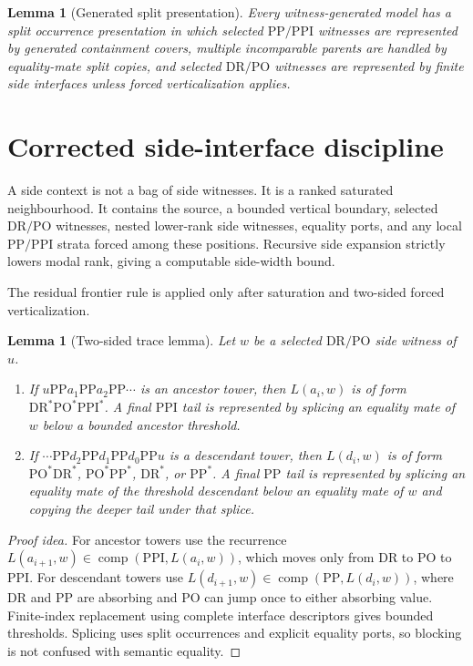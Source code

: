 \documentclass[11pt]{article}
\newtheorem{lemma}[theorem]{Lemma}
\newcommand{\comp}{\operatorname{comp}}
\newcommand{\PP}{\mathrm{PP}}
\newcommand{\PPI}{\mathrm{PPI}}
\newcommand{\DR}{\mathrm{DR}}
\newcommand{\PO}{\mathrm{PO}}
\begin{document}
\begin{lemma}[Generated split presentation]
Every witness-generated model has a split occurrence presentation in which selected $\PP/\PPI$ witnesses are represented by generated containment covers, multiple incomparable parents are handled by equality-mate split copies, and selected $\DR/\PO$ witnesses are represented by finite side interfaces unless forced verticalization applies.
\end{lemma}

\section{Corrected side-interface discipline}

A side context is not a bag of side witnesses.  It is a ranked saturated neighbourhood.  It contains the source, a bounded vertical boundary, selected $\DR/\PO$ witnesses, nested lower-rank side witnesses, equality ports, and any local $\PP/\PPI$ strata forced among these positions.  Recursive side expansion strictly lowers modal rank, giving a computable side-width bound.

The residual frontier rule is applied only after saturation and two-sided forced verticalization.

\begin{lemma}[Two-sided trace lemma]
Let $w$ be a selected $\DR/\PO$ side witness of $u$.
\begin{enumerate}[label=(\alph*)]
\item If $u\PP a_1\PP a_2\PP\cdots$ is an ancestor tower, then $L(a_i,w)$ is of form $\DR^*\PO^*\PPI^*$.  A final $\PPI$ tail is represented by splicing an equality mate of $w$ below a bounded ancestor threshold.
\item If $\cdots\PP d_2\PP d_1\PP d_0\PP u$ is a descendant tower, then $L(d_i,w)$ is of form $\PO^*\DR^*$, $\PO^*\PP^*$, $\DR^*$, or $\PP^*$.  A final $\PP$ tail is represented by splicing an equality mate of the threshold descendant below an equality mate of $w$ and copying the deeper tail under that splice.
\end{enumerate}
\end{lemma}

\begin{proof}[Proof idea]
For ancestor towers use the recurrence $L(a_{i+1},w)\in\comp(\PPI,L(a_i,w))$, which moves only from $\DR$ to $\PO$ to $\PPI$.  For descendant towers use $L(d_{i+1},w)\in\comp(\PP,L(d_i,w))$, where $\DR$ and $\PP$ are absorbing and $\PO$ can jump once to either absorbing value.  Finite-index replacement using complete interface descriptors gives bounded thresholds.  Splicing uses split occurrences and explicit equality ports, so blocking is not confused with semantic equality.
\end{proof}
\end{document}
